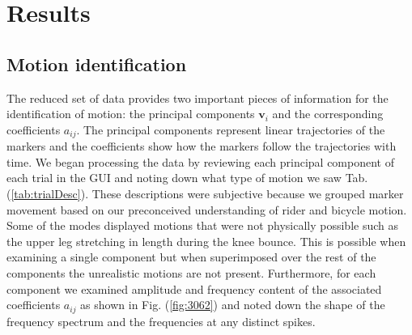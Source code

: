 \section{Results}
\label{sec:results}
\subsection{Motion identification}
\label{sec:motionId}
The reduced set of data provides two important pieces of information for the
identification of motion: the principal components $\mathbf{v}_i$ and the
corresponding coefficients $a_{ij}$. The principal components represent linear
trajectories of the markers and the coefficients show how the markers follow
the trajectories with time. We began processing the data by reviewing each
principal component of each trial in the GUI and noting down what type of
motion we saw Tab. (\ref{tab:trialDesc}). These descriptions were subjective
because we grouped marker movement based on our preconceived understanding of
rider and bicycle motion. Some of the modes displayed motions that were not
physically possible such as the upper leg stretching in length during the knee
bounce. This is possible when examining a single component but when
superimposed over the rest of the components the unrealistic motions are not
present. Furthermore, for each component we examined amplitude and frequency
content of the associated coefficients $a_{ij}$ as shown in Fig.
(\ref{fig:3062}) and noted down the shape of the frequency spectrum and the
frequencies at any distinct spikes.


